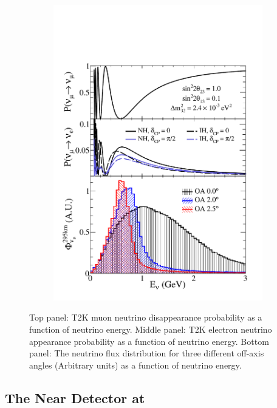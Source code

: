 \begin{figure}[h]
  \begin{subfigure}[t]{0.7\textwidth}
    \includegraphics[width=\textwidth, trim={0mm 0mm 0mm 0mm}, clip,page=1]{Figures/Detectors/T2KOffAxisTrick.pdf}
  \end{subfigure}
  \caption{Top panel: T2K muon neutrino disappearance probability as a function of neutrino energy. Middle panel: T2K electron neutrino appearance probability as a function of neutrino energy. Bottom panel: The neutrino flux distribution for three different off-axis angles (Arbitrary units) as a function of neutrino energy.}
  \label{fig:T2KSKExp_T2K_OffAxisTrick}
\end{figure}

\subsection{The Near Detector at }
\label{subsec:T2KSKExp_T2K_ND280}

